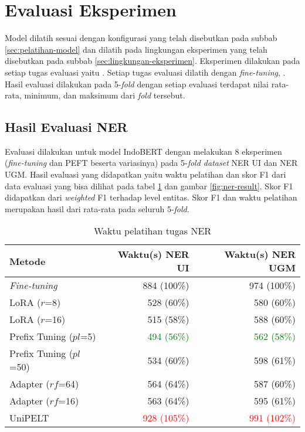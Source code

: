 \section{Evaluasi Eksperimen}

Model dilatih sesuai dengan konfigurasi yang telah disebutkan pada subbab \ref{sec:pelatihan-model} dan dilatih pada lingkungan eksperimen yang telah disebutkan pada subbab \ref{sec:lingkungan-eksperimen}. Eksperimen dilakukan pada setiap tugas evaluasi yaitu \nlptask. Setiap tugas evaluasi dilatih dengan \textit{fine-tuning}, \methodPEFT. Hasil evaluasi dilakukan pada 5-\textit{fold} dengan setiap evaluasi terdapat nilai rata-rata, minimum, dan maksimum dari \textit{fold} tersebut.

\subsection{Hasil Evaluasi NER}
\label{sec:ner-evaluation}

Evaluasi dilakukan untuk model IndoBERT dengan melakukan 8 eksperimen (\textit{fine-tuning} dan PEFT beserta variasinya) pada 5-\textit{fold dataset} NER UI dan NER UGM. Hasil evaluasi yang didapatkan yaitu waktu pelatihan dan skor F1 dari data evaluasi yang bisa dilihat pada tabel \ref{table:runtime-ner} dan gambar \ref{fig:ner-result}. Skor F1 didapatkan dari \textit{weighted} F1 terhadap level entitas. Skor F1 dan waktu pelatihan merupakan hasil dari rata-rata pada seluruh 5-\textit{fold}.

\begin{table}[h]
    \centering
    \caption{Waktu pelatihan tugas NER}
    \label{table:runtime-ner}
    \begin{tabular}{l|r|r}
        \toprule
        \textbf{Metode} & \textbf{Waktu(s) NER UI} & \textbf{Waktu(s) NER UGM} \\
        \midrule
        \textit{Fine-tuning} & 884 (100\%) & 974 (100\%) \\
        LoRA ($r$=8) & 528 (60\%) & 580 (60\%) \\
        LoRA ($r$=16) & 515 (58\%) & 588 (60\%) \\
        Prefix Tuning ($pl$=5) & \textcolor{Green}{494 (56\%)} & \textcolor{Green}{562 (58\%)} \\
        Prefix Tuning ($pl$=50) & 534 (60\%) & 598 (61\%) \\
        Adapter ($rf$=64) & 564 (64\%) & 587 (60\%) \\
        Adapter ($rf$=16) & 563 (64\%) & 595 (61\%) \\
        UniPELT & \textcolor{Red}{928 (105\%)} & \textcolor{Red}{991 (102\%)} \\
        \bottomrule
    \end{tabular}
\end{table}

